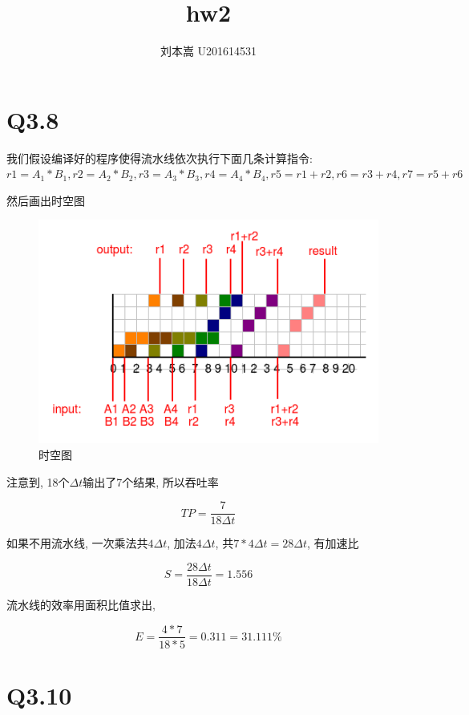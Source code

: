 \documentclass{article}
\begin{document}
\begin{CJK}{UTF8}{gbsn}

\title{hw2}
\author{刘本嵩 U201614531}

\maketitle


\section{Q3.8}
\Large
\smallskip

我们假设编译好的程序使得流水线依次执行下面几条计算指令: 
$ r1=A_1*B_1, r2=A_2*B_2, r3=A_3*B_3, r4=A_4*B_4, 
r5=r1+r2, r6=r3+r4, r7=r5+r6 $

然后画出时空图

\begin{figure}[H]
\centering
\includegraphics[scale=1]{hw2-img1.png}
\caption{时空图}
\end{figure}

注意到, 18个$\Delta t$输出了7个结果, 所以吞吐率

$$TP = \frac{7}{18\Delta t}$$

如果不用流水线, 一次乘法共$4\Delta t$, 加法$4\Delta t$, 共$7*4\Delta t = 28\Delta t$, 有加速比

$$S = \frac{28\Delta t}{18\Delta t} = 1.556$$

流水线的效率用面积比值求出,

$$E=\frac{4*7}{18*5}=0.311 = 31.111\%$$

\section{Q3.10}
\Large
\smallskip


\end{CJK}
\end{document}
